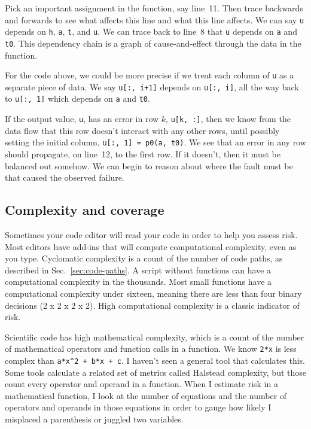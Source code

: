 \documentclass[fleqn,10pt]{olplainarticle}
\begin{document}
Pick an important assignment in the function, say line~11.
Then trace backwards and forwards to see what affects this line
and what this line affects. We can say \lstinline|u| depends
on \lstinline|h|, \lstinline|a|, \lstinline|t|, and \lstinline|u|.
We can trace back to line~8 that \lstinline|u| depends on
\lstinline|a| and \lstinline|t0|. This dependency chain is a
graph of cause-and-effect through the data in the function.

For the code above, we could be more precise if
we treat each column of \lstinline|u|
as a separate piece of data. We say \lstinline|u[:, i+1]|
depends on \lstinline|u[:, i]|, all the way back to 
\lstinline|u[:, 1]| which depends on \lstinline|a| and
\lstinline|t0|.

If the output value, \lstinline|u|, has an error in row $k$,
\lstinline|u[k, :]|, then we know from the data flow that
this row doesn't interact with any other rows, until possibly
setting the initial column, \lstinline|u[:, 1] = p0(a, t0)|.
We see that an error in any row should propagate, on line~12,
to the first row. If it doesn't, then it must be balanced out
somehow. We can begin to reason about where the fault must
be that caused the observed failure.


\subsection{Complexity and coverage}

Sometimes your code editor will read your code in order to help
you assess risk. Most editors have add-ins that will compute
computational complexity, even as you type. Cyclomatic complexity
is a count of the number of code paths, as described in Sec.~\ref{sec:code-paths}. A script without functions can have a computational
complexity in the thousands. Most small functions have a computational
complexity under sixteen, meaning there are less than four binary
decisions (2 x 2 x 2 x 2). High computational complexity is a
classic indicator of risk.

Scientific code has high mathematical complexity, which is a count
of the number of mathematical operators and function calls in a
function. We know \lstinline|2*x| is less complex than
\lstinline|a*x^2 + b*x + c|.
I haven't seen a general tool that calculates this. Some tools
calculate a related set of metrics called Halstead complexity,
but those count every operator and operand in a function.
When I estimate risk in a mathematical function, I look at
the number of equations and the number of operators and operands
in those equations in order to gauge how likely I misplaced a
parenthesis or juggled two variables.
\end{document}
